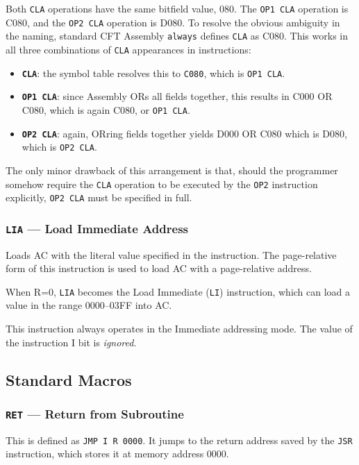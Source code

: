 \documentclass[11pt,a4paper,twocolumns]{article}
\newcommand\hex[1]{\textsf{#1}}
\newcommand\register[1]{\textsf{#1}}
\newcommand\A{\register{AC}}
\begin{document}
Both {\tt CLA} operations have the same bitfield value, \hex{080}. The
{\tt OP1 CLA} operation is \hex{C080}, and the {\tt OP2 CLA} operation
is \hex{D080}. To resolve the obvious ambiguity in the naming,
standard CFT Assembly {\tt always\/} defines {\tt CLA} as
\hex{C080}. This works in all three combinations of {\tt CLA}
appearances in instructions:

\begin{itemize}
\item{\textbf{\tt CLA}:} the symbol table resolves this to {\tt C080},
  which is {\tt OP1 CLA}.
\item{\textbf{\tt OP1 CLA}:} since Assembly ORs all fields together,
  this results in \hex{C000 OR C080}, which is again \hex{C080}, or
  {\tt OP1 CLA}.
\item{\textbf{\tt OP2 CLA}:} again, ORring fields together yields
  \hex{D000 OR C080} which is \hex{D080}, which is {\tt OP2 CLA}.
\end{itemize}

The only minor drawback of this arrangement is that, should the
programmer somehow require the {\tt CLA} operation to be executed by
the {\tt OP2} instruction explicitly, {\tt OP2 CLA} must be specified
in full.

\subsubsection{{\tt LIA} — Load Immediate Address}
\label{sec-lia}
\label{sec-li}

Loads \A{} with the literal value specified in the instruction. The
page-relative form of this instruction is used to load \A{} with a
page-relative address.

When R=0, {\tt LIA} becomes the Load Immediate ({\tt LI}) instruction,
which can load a value in the range \hex{0000}–\hex{03FF} into \A.

This instruction always operates in the Immediate addressing mode. The
value of the instruction I bit is {\em ignored}.

\subsection{Standard Macros}
\subsubsection{{\tt RET} — Return from Subroutine}

This is defined as {\tt JMP I R 0000}. It jumps to the return address
saved by the {\tt JSR} instruction, which stores it at memory address
\hex{0000}.
\end{document}
